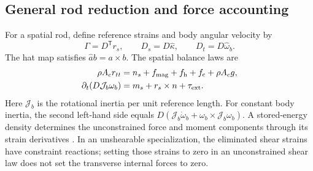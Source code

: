 \subsection{General rod reduction and force accounting}
\label{sm:general}
For a spatial rod, define reference strains and body angular velocity by
\begin{equation}
 \Gamma=D^{\mathsf T}r_s,\qquad
 D_s=D\widehat\kappa,\qquad
 D_t=D\widehat\omega_b.
 \label{sm:rod-kinematics}
\end{equation}
The hat map satisfies $\widehat a b=a\times b$.
The spatial balance laws are
\begin{align}
 \rho A_c r_{tt}&=n_s+f_{\rm mag}+f_{\rm h}+f_{\rm c}+\rho A_c g,\\
 \partial_t(D\mathcal J_b\omega_b)&=m_s+r_s\times n+\tau_{\rm ext}.
 \label{sm:rod-balances}
\end{align}
Here $\mathcal J_b$ is the rotational inertia per unit reference
length. For constant body inertia, the second left-hand side equals
$D(\mathcal J_b\dot\omega_b+\omega_b\times\mathcal J_b\omega_b)$.
A stored-energy density determines the unconstrained force and moment
components through its strain derivatives \citep{simo,antman}.
In an unshearable specialization, the eliminated shear strains have
constraint reactions; setting those strains to zero in an unconstrained
shear law does not set the transverse internal forces to zero.

